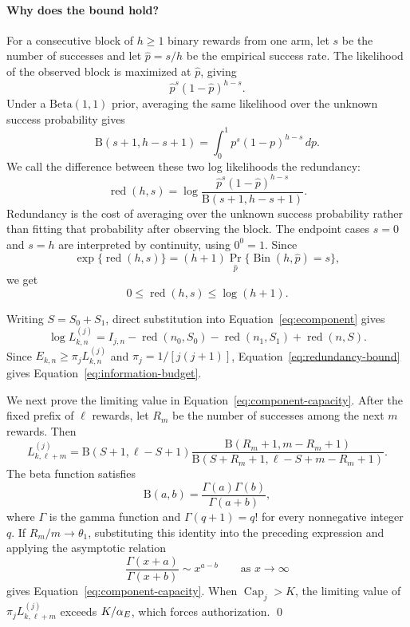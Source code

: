 \paragraph{Why does the bound hold?}
For a consecutive block of $h\geq1$ binary rewards from one arm, let $s$ be
the number of successes and let $\widehat p=s/h$ be the empirical success
rate.
The likelihood of the observed block is maximized at $\widehat p$, giving
\[
\widehat p^s(1-\widehat p)^{h-s}.
\]
Under a $\mathrm{Beta}(1,1)$ prior, averaging the same likelihood over the
unknown success probability gives
\[
\mathrm{B}(s+1,h-s+1)
=
\int_0^1 p^s(1-p)^{h-s}\,dp.
\]
We call the difference between these two log likelihoods the redundancy:
\begin{equation}
 \operatorname{red}(h,s)
 =
 \log
 \frac{\widehat p^s(1-\widehat p)^{h-s}}
 {\mathrm{B}(s+1,h-s+1)}.
 \label{eq:redundancy}
\end{equation}
Redundancy is the cost of averaging over the unknown success probability rather than
fitting that probability after observing the block.
The endpoint cases $s=0$ and $s=h$ are interpreted by continuity, using $0^0=1$.
Since
\[
 \exp\{\operatorname{red}(h,s)\}
 =
 (h+1)
 \Pr_{\widehat p}\{\operatorname{Bin}(h,\widehat p)=s\},
\]
we get
\begin{equation}
 0
 \le
 \operatorname{red}(h,s)
 \le
 \log(h+1).
 \label{eq:redundancy-bound}
\end{equation}

Writing $S=S_0+S_1$, direct substitution into
Equation~\eqref{eq:ecomponent} gives
\begin{equation}
 \log L_{k,n}^{(j)}
 =
 I_{j,n}
 -\operatorname{red}(n_0,S_0)
 -\operatorname{red}(n_1,S_1)
 +\operatorname{red}(n,S).
 \label{eq:exact-information}
\end{equation}
Since $E_{k,n}\ge\pi_jL_{k,n}^{(j)}$ and
$\pi_j=1/[j(j+1)]$, Equation~\eqref{eq:redundancy-bound} gives
Equation~\eqref{eq:information-budget}.

We next prove the limiting value in
Equation~\eqref{eq:component-capacity}.
After the fixed prefix of $\ell$ rewards, let $R_m$ be the number of successes among the next $m$ rewards.
Then
\[
 L_{k,\ell+m}^{(j)}
 =
 \mathrm B(S+1,\ell-S+1)
 \frac{
 \mathrm B(R_m+1,m-R_m+1)
 }{
 \mathrm B(S+R_m+1,\ell-S+m-R_m+1)
 }.
\]
The beta function satisfies
\[
\mathrm{B}(a,b)
=
\frac{\Gamma(a)\Gamma(b)}{\Gamma(a+b)},
\]
where $\Gamma$ is the gamma function and $\Gamma(q+1)=q!$ for every
nonnegative integer $q$.
If $R_m/m\to\theta_1$, substituting this identity
into the preceding expression and applying the asymptotic relation
\[
\frac{\Gamma(x+a)}{\Gamma(x+b)}
\sim
x^{a-b}
\qquad\text{as }x\to\infty
\]
gives Equation~\eqref{eq:component-capacity}.
When
$\operatorname{Cap}_j>K$, the limiting value of
$\pi_jL_{k,\ell+m}^{(j)}$ exceeds $K/\alpha_E$, which forces authorization. \qed

